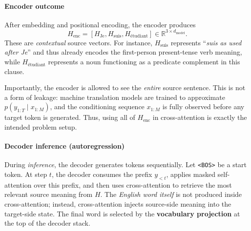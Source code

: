 \paragraph{Encoder outcome}
\noindent
After embedding and positional encoding, the encoder produces
\[
H_{\text{enc}}
=
[H_{\text{Je}}, H_{\text{suis}}, H_{\text{\'{e}tudiant}}]
\in \mathbb{R}^{3 \times d_{\text{model}}}.
\]
These are \emph{contextual} source vectors.
For instance, \(H_{\text{suis}}\) represents ``\emph{suis as used after Je}''
and thus already encodes the first-person present-tense verb meaning,
while \(H_{\text{\'{e}tudiant}}\) represents a noun functioning as a predicate complement in this clause.

\noindent
Importantly, the encoder is allowed to see the \emph{entire} source sentence.
This is not a form of leakage:
machine translation models are trained to approximate
\(p(y_{1:T}\mid x_{1:M})\),
and the conditioning sequence \(x_{1:M}\) is fully observed before any target token is generated.
Thus, using all of \(H_{\text{enc}}\) in cross-attention is exactly the intended problem setup.

\paragraph{Decoder inference (autoregression)}
\noindent
During \emph{inference}, the decoder generates tokens sequentially.
Let \texttt{<BOS>} be a start token.
At step \(t\), the decoder consumes the prefix \(y_{<t}\),
applies masked self-attention over this prefix,
and then uses cross-attention to retrieve the most relevant source meaning from \(H\).
The \emph{English word itself} is not produced inside cross-attention;
instead, cross-attention injects source-side meaning into the target-side state.
The final word is selected by the \textbf{vocabulary projection} at the top of the decoder stack.

